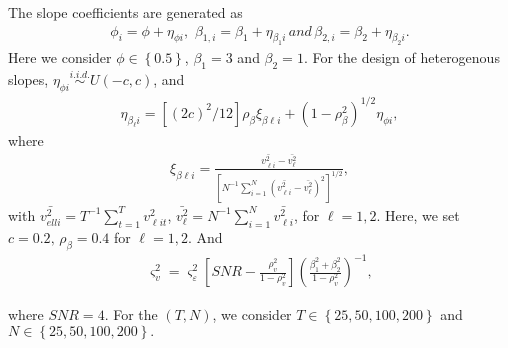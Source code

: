 \documentclass[12pt,a4paper,hyperref]{article}
\begin{document}
The slope coefficients are generated as
\begin{align}
\phi_{i}=\phi+\eta_{\phi i},\,\, \beta_{1,i}=\beta_{1}+\eta_{\beta_{1} i}\, and\, \beta_{2,i}=\beta_{2}+\eta_{\beta_{2}i}.
\end{align}
Here we consider $\phi \in \left\{0.5\right\}$, $\beta_{1}=3$ and $\beta_{2}=1$. For the design of heterogenous slopes, $\eta_{\phi i} \overset{i.i.d.}{\sim} U\left( -c, c\right)$, and
\begin{align}
\eta_{\beta_{\ell}i}=\left[(2c)^{2}/12 \right]\rho_{\beta}\xi_{\beta \ell i}+ \left(1-\rho^{2}_{\beta}  \right)^{1/2}\eta_{\phi i},
\end{align}
where
\begin{align}
\xi_{\beta \ell i}=\frac{\bar{v^{2}_{\ell i}}- \bar{v^{2}_{\ell}}}{\left[ N^{-1}\sum^{N}_{i=1} \left( \bar{v^{2}_{\ell i}}- \bar{v^{2}_{\ell }}\right)^{2} \right]^{1/2} },
\end{align}
with $\bar{v^{2}_{ell i}}=T^{-1}\sum^{T}_{t=1}v^{2}_{\ell i t}$, $\bar{v^{2}_{\ell}}=N^{-1} \sum^{N}_{i=1} \bar{v^{2}_{\ell i}}$, for $\ell=1,2.$
Here, we set $c=0.2,\, \rho_{\beta}=0.4$ for $\ell=1,2.$ And
\begin{align}
\varsigma^{2}_{v}=\varsigma^{2}_{\varepsilon}\left[SNR-\frac{\rho^{2}_{v}}{1-\rho^{2}_{v}}   \right]\left(\frac{\beta^{2}_{1}+\beta^{2}_{2}}{1-\rho^{2}_{v}}  \right)^{-1},
\end{align}

where $SNR=4$. For the $(T,N)$, we consider $T \in \left\{25, 50, 100, 200  \right\}$ and  $N \in \left\{25, 50, 100, 200  \right\}.$






\newpage
\appendix
\appendixpage
\end{document}
